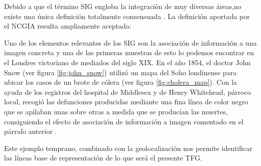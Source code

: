 Debido a que el término \ac{SIG} engloba la integración de muy diversas áreas,no existe una única definición totalmente consensuada \cite{Chr97}. La definición aportada por el \ac{NCGIA} resulta ampliamente aceptada:

\vspace{5mm}
\vspace{5mm}

Uno de los elementos relevantes de los \ac{SIG} son la asociación de información a una imagen concreta y una de las primeras muestras de esto lo podemos encontrar en el Londres victoriano de mediados del siglo XIX. En el año 1854, el doctor John Snow (ver figura \ref{fig:john_snow}) utilizó un mapa del Soho londinense para ubicar los casos de un brote de cólera (ver figura \ref{fig:cholera_map}). Con la ayuda de los registros del hospital de Middlesex y de Henry Whitehead, párroco local, recogió las defunciones producidas mediante una fina línea de color negro que se apilaban unas sobre otras a medida que se producían las muertes, consiguiendo el efecto de asociación de información a imagen comentado en el párrafo anterior \cite{Cai11}.

Este ejemplo temprano, combinado con la geolocalización nos permite identificar las líneas base de representación de lo que será el presente \ac{TFG}.

